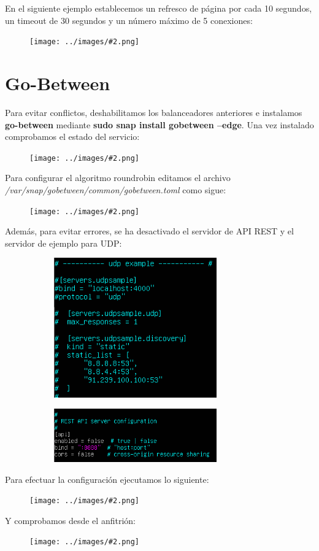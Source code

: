 \documentclass[twoside]{article}
\newcommand{\image}[2]{
\begin{figure}[H]
    \texttt{[image: ../images/\#2.png]}
    \centering
\end{figure}
}
\begin{document}
En el siguiente ejemplo establecemos un refresco de página por cada 10 segundos, un timeout de 30 segundos y un número máximo de 5 conexiones:
\image{8}{28}

\section{Go-Between}
Para evitar conflictos, deshabilitamos los balanceadores anteriores e instalamos \textbf{go-between} mediante \textbf{sudo snap install gobetween --edge}. Una vez instalado comprobamos el estado del servicio:
\image{8}{29}
Para configurar el algoritmo roundrobin editamos el archivo \textit{/var/snap/gobetween/common/gobetween.toml} como sigue:
\image{6}{30}
Además, para evitar errores, se ha desactivado el servidor de API REST y el servidor de ejemplo para UDP:
\begin{figure}[H]
    \centering
    \begin{subfigure}{.5\textwidth}
        \centering
        \includegraphics[width=7cm]{../images/31.png}
    \end{subfigure}%
    \begin{subfigure}{.5\textwidth}
        \centering
        \includegraphics[width=7cm]{../images/32.png}
    \end{subfigure}
\end{figure}
Para efectuar la configuración ejecutamos lo siguiente:
\image{8}{33}
Y comprobamos desde el anfitrión:
\image{8}{34}
\end{document}
